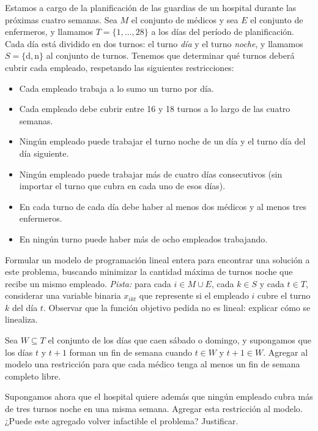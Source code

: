 \documentclass[11pt,a4paper]{article}
\begin{document}
\newpage
Estamos a cargo de la planificación de las guardias de un hospital durante las
próximas cuatro semanas. Sea $M$ el conjunto de médicos y sea $E$ el conjunto de
enfermeros, y llamamos $T = \{1,\dots,28\}$ a los días del período de
planificación. Cada día está dividido en dos turnos: el turno \emph{día} y el
turno \emph{noche}, y llamamos $S = \{\mathrm{d}, \mathrm{n}\}$ al conjunto de
turnos. Tenemos que determinar qué turnos deberá cubrir cada empleado,
respetando las siguientes restricciones:

\begin{itemize}
  \item Cada empleado trabaja a lo sumo un turno por día.
  \item Cada empleado debe cubrir entre 16 y 18 turnos a lo largo de las cuatro
  semanas.
  \item Ningún empleado puede trabajar el turno noche de un día y el turno día
  del día siguiente.
  \item Ningún empleado puede trabajar más de cuatro días consecutivos
  (sin importar el turno que cubra en cada uno de esos días).
  \item En cada turno de cada día debe haber al menos dos médicos y al menos
  tres enfermeros.
  \item En ningún turno puede haber más de ocho empleados trabajando.
\end{itemize}

\begin{puntos}
  \item Formular un modelo de programación lineal entera para encontrar una
  solución a este problema, buscando minimizar la cantidad máxima de turnos
  noche que recibe un mismo empleado. \emph{Pista:} para cada
  $i \in M \cup E$, cada $k \in S$ y cada $t \in T$, considerar una variable
  binaria $x_{ikt}$ que represente si el empleado $i$ cubre el turno $k$ del
  día $t$. Observar que la función objetivo pedida no es lineal: explicar cómo
  se linealiza.

  \item Sea $W \subseteq T$ el conjunto de los días que caen sábado o domingo,
  y supongamos que los días $t$ y $t+1$ forman un fin de semana cuando
  $t \in W$ y $t+1 \in W$. Agregar al modelo una restricción para que cada
  médico tenga al menos un fin de semana completo libre.

  \item Supongamos ahora que el hospital quiere además que ningún empleado
  cubra más de tres turnos noche en una misma semana. Agregar esta restricción
  al modelo. ¿Puede este agregado volver infactible el problema? Justificar.
\end{puntos}
\end{document}

